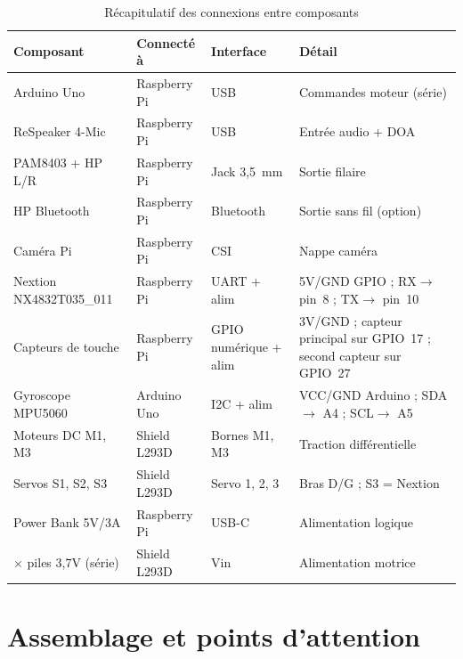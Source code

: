 \documentclass[a4paper,12pt]{report}
\begin{document}
	\begin{table}[htbp]
		\centering
		\caption{Récapitulatif des connexions entre composants}
		\label{tab:cablage}
		\renewcommand{\arraystretch}{1.25}
		\begin{tabularx}{\textwidth}{|>{\raggedright\arraybackslash}p{3.2cm}|>{\raggedright\arraybackslash}p{2.8cm}|>{\raggedright\arraybackslash}p{2.2cm}|>{\raggedright\arraybackslash}X|}
			\hline
			\textbf{Composant} & \textbf{Connecté à} & \textbf{Interface} & \textbf{Détail} \\
			\hline
			Arduino Uno & Raspberry Pi & USB & Commandes moteur (série) \\
			\hline
			ReSpeaker 4-Mic & Raspberry Pi & USB & Entrée audio + DOA \\
			\hline
			PAM8403 + HP L/R & Raspberry Pi & Jack 3{,}5~mm & Sortie filaire \\
			\hline
			HP Bluetooth & Raspberry Pi & Bluetooth & Sortie sans fil (option) \\
			\hline
			Caméra Pi & Raspberry Pi & CSI & Nappe caméra \\
			\hline
			Nextion NX4832T035\_011 & Raspberry Pi & UART + alim &
			5V/GND GPIO ; RX$\rightarrow$ pin~8 ; TX$\rightarrow$ pin~10 \\
			\hline
			Capteurs de touche & Raspberry Pi & GPIO numérique + alim &
			3{,}3V/GND ; capteur principal sur GPIO~17 ; second capteur sur GPIO~27 \\
			\hline
			Gyroscope MPU5060 & Arduino Uno & I2C + alim &
			VCC/GND Arduino ; SDA$\rightarrow$ A4 ; SCL$\rightarrow$ A5 \\
			\hline
			Moteurs DC M1, M3 & Shield L293D & Bornes M1, M3 & Traction différentielle \\
			\hline
			Servos S1, S2, S3 & Shield L293D & Servo 1, 2, 3 & Bras D/G ; S3 = Nextion \\
			\hline
			Power Bank 5V/3A & Raspberry Pi & USB-C & Alimentation logique \\
			\hline
			3$\times$ piles 3{,}7V (série) & Shield L293D & Vin & Alimentation motrice \\
			\hline
		\end{tabularx}
	\end{table}
	
	\section{Assemblage et points d'attention}
	
\end{document}
